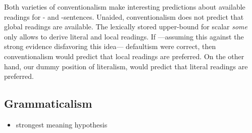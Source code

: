 \documentclass[fleqn,reqno,10pt,draft]{article}
\newcommand{\as}{\acro{as}}
\renewcommand{\es}{\acro{es}}
\begin{document}
Both varieties of conventionalism make interesting predictions about
available readings for \as- and \es-sentences. Unaided,
conventionalism does not predict that global readings are
available. The lexically stored upper-bound for scalar \emph{some}
only allows to derive literal and local readings. If ---assuming this
against the strong evidence disfavoring this idea--- defaultism were
correct, then conventionalism would predict that local readings are
preferred. On the other hand, our dummy position of literalism, would
predict that literal readings are preferred. 




\subsection{Grammaticalism}
\label{sec:grammaticalism}


\bigskip

\begin{itemize}
\item strongest meaning hypothesis
\end{itemize}
\end{document}
